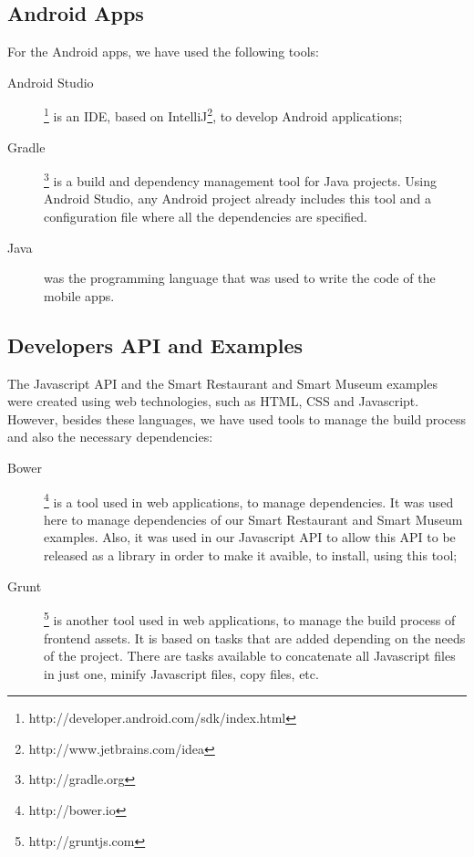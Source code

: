 \subsection{Android Apps}
\label{sub:implementation_tools_android_apps}
For the Android apps, we have used the following tools:
\begin{description}
  \item[Android Studio] \footnote{http://developer.android.com/sdk/index.html} is an \gls{IDE}, based on IntelliJ\footnote{http://www.jetbrains.com/idea},
  to develop Android
  applications;
  \item[Gradle] \footnote{http://gradle.org} is a build and dependency management tool for Java projects. Using Android Studio, any Android project already includes this tool and a configuration file where all the dependencies are specified.
  \item[Java] was the programming language that was used to write the code of the mobile apps.
\end{description}

\subsection{Developers \gls{API} and Examples}
\label{sub:implementation_tools_developers_api_and_examples}
The Javascript \gls{API} and the Smart Restaurant and Smart Museum examples were created using web technologies, such as \gls{HTML}, \gls{CSS} and Javascript.
However, besides these languages, we have used tools to manage the build process and also the necessary dependencies:
\begin{description}
  \item[Bower]\footnote{http://bower.io} is a tool used in web applications, to manage dependencies. It was used here to manage dependencies of our Smart Restaurant and Smart Museum examples.
  Also, it was used in our Javascript \gls{API} to allow this \gls{API} to be released as a library in order to make it avaible, to install, using this tool;
  \item[Grunt]\footnote{http://gruntjs.com} is another tool used in web applications, to manage the build process of frontend assets.
  It is based on tasks that are added depending on the needs of the project.
  There are tasks available to concatenate all Javascript files in just one, minify Javascript files, copy files, etc.
\end{description}

